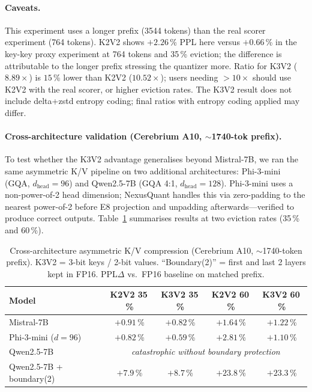 \documentclass{article}
\begin{document}
\paragraph{Caveats.}
This experiment uses a longer prefix (3544 tokens) than the real scorer experiment
(764 tokens). K2V2 shows $+2.26$\,\% PPL here versus $+0.66$\,\% in the
key-key proxy experiment at 764 tokens and 35\,\% eviction; the difference is
attributable to the longer prefix stressing the quantizer more. Ratio for K3V2
($8.89\times$) is $15$\,\% lower than K2V2 ($10.52\times$); users needing
$>10\times$ should use K2V2 with the real scorer, or higher eviction rates.
The K3V2 result does not include delta+zstd entropy coding; final ratios with
entropy coding applied may differ.

\paragraph{Cross-architecture validation (Cerebrium A10, $\sim$1740-tok prefix).}
To test whether the K3V2 advantage generalises beyond Mistral-7B, we ran the same
asymmetric K/V pipeline on two additional architectures: Phi-3-mini (GQA,
$d_{\text{head}}=96$) and Qwen2.5-7B (GQA 4:1, $d_{\text{head}}=128$).
Phi-3-mini uses a non-power-of-2 head dimension; NexusQuant handles this via
zero-padding to the nearest power-of-2 before E8 projection and unpadding
afterwards---verified to produce correct outputs.
Table~\ref{tab:cross_arch} summarises results at two eviction rates (35\,\% and 60\,\%).

\begin{table}[h]
\centering
\caption{Cross-architecture asymmetric K/V compression (Cerebrium A10,
  $\sim$1740-token prefix). K3V2 = 3-bit keys / 2-bit values.
  ``Boundary(2)'' = first and last 2 layers kept in FP16.
  PPL$\Delta$ vs.\ FP16 baseline on matched prefix.}
\label{tab:cross_arch}
\begin{tabular}{lcccc}
\toprule
Model & K2V2 35\,\% & K3V2 35\,\% & K2V2 60\,\% & K3V2 60\,\% \\
\midrule
Mistral-7B              & $+0.91$\,\% & $+0.82$\,\% & $+1.64$\,\% & $+1.22$\,\% \\
Phi-3-mini ($d\!=\!96$) & $+0.82$\,\% & $+0.59$\,\% & $+2.81$\,\% & $+1.10$\,\% \\
Qwen2.5-7B              & \multicolumn{4}{c}{\textit{catastrophic without boundary protection}} \\
Qwen2.5-7B + boundary(2) & $+7.9$\,\% & $+8.7$\,\% & $+23.8$\,\% & $+23.3$\,\% \\
\bottomrule
\end{tabular}
\end{table}
\end{document}
